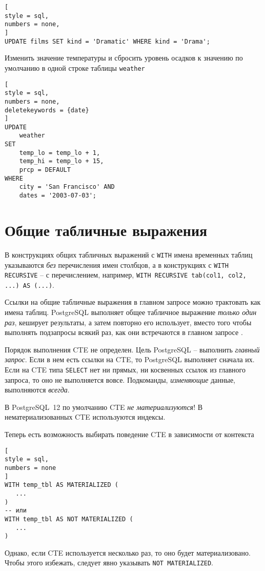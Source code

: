\documentclass[%
	11pt,
	a4paper,
	utf8,
		]{article}
\begin{document}
\begin{lstlisting}[
style = sql,
numbers = none,
]
UPDATE films SET kind = 'Dramatic' WHERE kind = 'Drama';
\end{lstlisting}

Изменить значение температуры и сбросить уровень осадков к значению по умолчанию в одной строке таблицы \texttt{weather}

\begin{lstlisting}[
style = sql,
numbers = none,
deletekeywords = {date}
]
UPDATE
    weather
SET
    temp_lo = temp_lo + 1,
    temp_hi = temp_lo + 15,
    prcp = DEFAULT
WHERE
    city = 'San Francisco' AND
    dates = '2003-07-03';
\end{lstlisting}


\section{Общие табличные выражения}

В конструкциях общих табличных выражений с \texttt{WITH} имена временных таблиц указываются \emph{без} перечисления имен столбцов, а в конструкциях с \texttt{WITH RECURSIVE} -- с перечислением, например, \lstinline[style=sql]{WITH RECURSIVE tab(col1, col2, ...) AS (...)}.

Ссылки на общие табличные выражения в главном запросе можно трактовать как имена таблиц. PostgreSQL выполняет общее табличное выражение \emph{только один раз}, кеширует результаты, а затем повторно его использует, вместо того чтобы выполнять подзапросы всякий раз, как они встречаются в главном запросе \cite[]{juba:2019}.

Порядок выполнения CTE не определен. Цель PostgreSQL -- выполнить \emph{главный запрос}. Если в нем есть ссылки на CTE, то PostgreSQL выполняет сначала их. Если на CTE типа \texttt{SELECT} нет ни прямых, ни косвенных ссылок из главного запроса, то оно не выполняется вовсе. Подкоманды, \emph{изменяющие} данные, выполняются \emph{всегда}.

В PostgreSQL~12 по умолчанию CTE \emph{не материализуются}! В нематериализованных CTE используются индексы.

Теперь есть возможность выбирать поведение CTE в зависимости от контекста
\begin{lstlisting}[
style = sql,
numbers = none
]
WITH temp_tbl AS MATERIALIZED (
   ...
)
-- или 
WITH temp_tbl AS NOT MATERIALIZED (
   ...
)
\end{lstlisting}

Однако, если CTE используется несколько раз, то оно будет материализовано. Чтобы этого избежать, следует явно указывать \texttt{NOT MATERIALIZED}.
\end{document}
